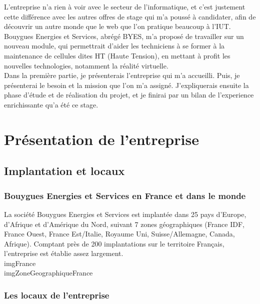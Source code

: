 \documentclass[a4paper]{article}
\begin{document}
    L'entreprise n'a rien à voir avec le secteur de l'informatique, et c'est justement cette différence avec les autres offres de stage qui m'a poussé à candidater, afin de découvrir un autre monde que le web que l'on pratique beaucoup à l'IUT. \\
    
    Bouygues Energies et Services, abrégé BYES, m'a proposé de travailler sur un nouveau module, qui permettrait d'aider les techniciens à se former à la maintenance de cellules dites HT (Haute Tension), en mettant à profit les nouvelles technologies, notamment la réalité virtuelle. \\

    Dans la première partie, je présenterais l'entreprise qui m'a accueilli. Puis, je présenterai le besoin et la mission que l'on m'a assigné. J'expliquerais ensuite la phase d'étude et de réalisation du projet, et je finirai par un bilan de l'experience enrichissante qu'a été ce stage. \\

    \newpage 
    \section{Présentation de l'entreprise}
    \subsection{Implantation et locaux}
    \subsubsection{Bouygues Energies et Services en France et dans le monde}

    La société Bouygues Energies et Services est implantée dans 25 pays d’Europe, d’Afrique et d’Amérique du Nord, suivant 7 zones géographiques (France IDF, France Ouest, France Est/Italie, Royaume Uni, Suisse/Allemagne, Canada, Afrique). Comptant près de 200 implantations sur le territoire Français, l’entreprise est établie assez largement. \\

    imgFrance \\
    imgZoneGeographiqueFrance \\

    \subsubsection{Les locaux de l'entreprise}
\end{document}
